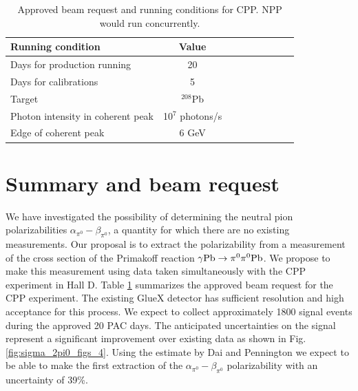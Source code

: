 \begin{table}[hbt]
\caption{Approved beam request and running conditions for CPP. NPP would run concurrently.
\label{request}
}
\begin{center}
\begin{tabular}{|l|c|c|c|c|c|c|c|c|}
\hline
\hline
  {\bf Running condition}  & {\bf Value}           \\ \hline
  Days for production running  &   20   \\ \hline
  Days for calibrations &  5       \\ \hline
  Target   & $^{208}$Pb   \\ \hline
  Photon intensity in coherent peak &   10$^7$ photons/s     \\ \hline
  Edge of coherent peak  &  6 GeV   \\ \hline
 \hline
 \hline
\end{tabular}
\end{center}
\end{table}
 
\section{Summary and beam request}
We have investigated the possibility of determining the neutral pion
polarizabilities $\alpha_{\pi^0}-\beta_{\pi^0}$, a quantity for which there are no existing measurements.
Our proposal is to extract the polarizability from a 
measurement of the cross section of the Primakoff reaction $\gamma
\rm{Pb}\rightarrow \pi^0 \pi^0 \rm{Pb}$. We propose to make this
measurement using data taken simultaneously with the CPP\cite{CPPexp}
experiment in Hall D. Table \ref{request} summarizes the approved beam request for the CPP experiment.
The existing GlueX detector has sufficient
resolution and high acceptance for this process. We expect to collect approximately 1800 signal events during the
approved 20 PAC days. The anticipated   uncertainties on
the signal represent a significant improvement over existing data as shown in Fig.\,\ref{fig:sigma_2pi0_figs_4}.
Using the estimate by Dai and Pennington \cite{Dai:2016ytz} we expect to be able to make the first extraction of the 
$\alpha_{\pi^0}-\beta_{\pi^0}$ polarizability with an uncertainty of 39\%.

